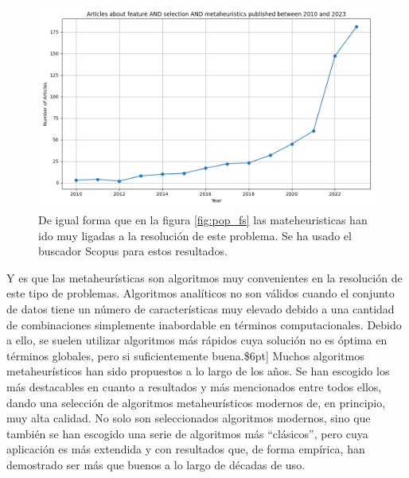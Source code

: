 \begin{figure}[H]
    \begin{center}
        \includegraphics[width=1\textwidth]{imagenes/scopus_chart2.png}
    \end{center}
    \caption[Popularidad de feature selection + metaheuristics sobre los años]{De igual forma que en la figura \ref{fig:pop_fs} las mateheuristicas han ido muy ligadas a la resolución de este problema. Se ha usado el buscador Scopus para estos resultados.}
\end{figure}

Y es que las metaheurísticas son algoritmos muy convenientes en la resolución de este tipo de problemas. Algoritmos analíticos no son válidos cuando el conjunto de datos tiene un número de características muy elevado debido a una cantidad de combinaciones simplemente inabordable en términos computacionales. Debido a ello, se suelen utilizar algoritmos más rápidos cuya solución no es óptima en términos globales, pero si suficientemente buena.\$6pt]
Muchos algoritmos metaheurísticos han sido propuestos a lo largo de los años. Se han escogido los más destacables en cuanto a resultados y más mencionados entre todos ellos, dando una selección de algoritmos metaheurísticos modernos de, en principio, muy alta calidad. No solo son seleccionados algoritmos modernos, sino que también se han escogido una serie de algoritmos más ``clásicos'', pero cuya aplicación es más extendida y con resultados que, de forma empírica, han demostrado ser más que buenos a lo largo de décadas de uso.

